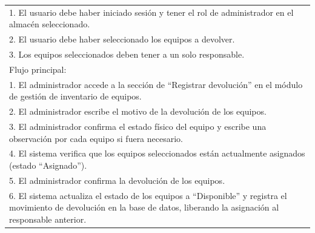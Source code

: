\documentclass[stu, 12pt, letterpaper, donotrepeattitle, floatsintext, natbib]{apa7}
\begin{document}
\begin{longtable}{@{} p{16.5cm} @{}}
    1. El usuario debe haber iniciado sesión y tener el rol de administrador en el almacén seleccionado.                                                                                                                             \\
    2. El usuario debe haber seleccionado los equipos a devolver.                                                                                                                                                                    \\
    3. Los equipos seleccionados deben tener a un solo responsable.                                                                                                                                                                  \\ \midrule
    Flujo principal:                                                                                                                                                                                                                 \\
    1. El administrador accede a la sección de ``Registrar devolución'' en el módulo de gestión de inventario de equipos.                                                                                                            \\
    2. El administrador escribe el motivo de la devolución de los equipos.                                                                                                                                                           \\
    3. El administrador confirma el estado físico del equipo y escribe una observación por cada equipo si fuera necesario.                                                                                                           \\
    4. El sistema verifica que los equipos seleccionados están actualmente asignados (estado ``Asignado'').                                                                                                                          \\
    5. El administrador confirma la devolución de los equipos.                                                                                                                                                                       \\
    6. El sistema actualiza el estado de los equipos a ``Disponible'' y registra el movimiento de devolución en la base de datos, liberando la asignación al responsable anterior.                                                   \\

\end{longtable}
\end{document}
